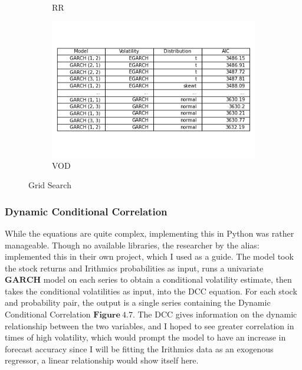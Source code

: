 \begin{figure}[hbt!]
\begin{subfigure}{.49\linewidth}
  \caption{RR}
  \label{fig:C}
\end{subfigure} %
\begin{subfigure}{.49\linewidth}
  \includegraphics[width=\linewidth]{images/modelFit/stockTSCO.L.png}
  \caption{VOD}
  \label{fig:D}
\end{subfigure}
\caption{Grid Search}
\end{figure}

\subsubsection{Dynamic Conditional Correlation}
While the equations are quite complex, implementing this in Python was rather manageable. Though no available libraries, the researcher by the alias: \cite{DirtyQuant} implemented this in their own project, which I used as a guide. The model took the stock returns and Irithmics probabilities as input, runs a univariate $\mathbf{GARCH}$ model on each series to obtain a conditional volatility estimate, then takes the conditional volatilities as input, into the DCC equation. For each stock and probability pair, the output is a single series containing the Dynamic Conditional Correlation $\mathbf{Figure~4.7}$. The DCC gives information on the dynamic relationship between the two variables, and I hoped to see greater correlation in times of high volatility, which would prompt the model to have an increase in forecast accuracy since I will be fitting the Irithmics data as an exogenous regressor, a linear relationship would show itself here. 

